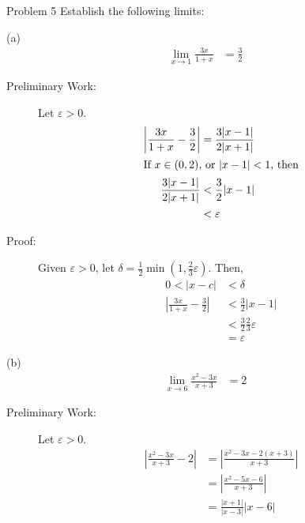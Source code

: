 \documentclass[10pt]{extarticle}
\begin{document}
  \begin{problem}{Problem 5}
    Establish the following limits:
    \begin{problem}{(a)}
      \begin{align*}
        \lim_{x\rightarrow 1} \frac{3x}{1+x} &= \frac{3}{2}
      \end{align*}
      \tcblower
      \begin{description}
        \item[Preliminary Work:] Let $\varepsilon > 0$.
          \begin{align*}
            \left|\frac{3x}{1+x} - \frac{3}{2}\right| &= \frac{3|x-1|}{2|x+1|} \\
            \shortintertext{If $x\in (0,2)$, or $|x-1| < 1$, then}
            \frac{3|x-1|}{2|x+1|} &< \frac{3}{2}|x-1|\\
                                  &< \varepsilon
          \end{align*}
        \item[Proof:] Given $\varepsilon > 0$, let $\delta = \frac{1}{2}\min\left(1,\frac{2}{3}\varepsilon\right)$. Then,
          \begin{align*}
            0 < |x-c| &< \delta\\
            \left|\frac{3x}{1+x}-\frac{3}{2}\right| &< \frac{3}{2}|x-1|\\
                                                    &< \frac{3}{2}\frac{2}{3}\varepsilon\\
                                                    &= \varepsilon
          \end{align*}
      \end{description}
    \end{problem}
    \begin{problem}{(b)}
      \begin{align*}
        \lim_{x\rightarrow 6} \frac{x^2 - 3x}{x+3} &= 2
      \end{align*}
      \tcblower
      \begin{description}
        \item[Preliminary Work:] Let $\varepsilon > 0$.
          \begin{align*}
            \left|\frac{x^2-3x}{x+3} - 2\right| &= \left|\frac{x^2 - 3x - 2(x+3)}{x+3}\right|\\
                                                &= \left|\frac{x^2 - 5x - 6}{x+3}\right|\\
                                                &= \frac{|x+1|}{|x-3|}|x-6|\\

\end{align*}
\end{description}
\end{problem}
\end{problem}
\end{document}
